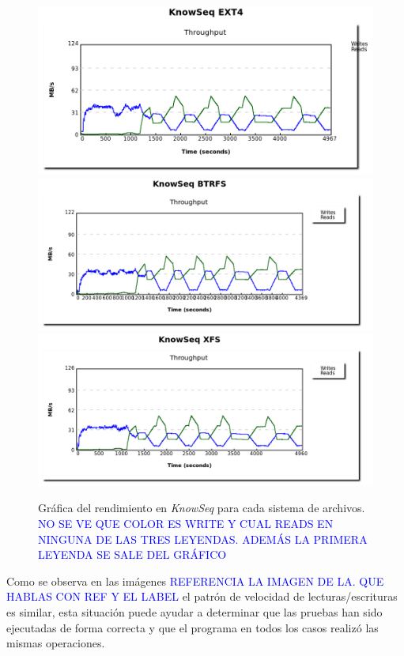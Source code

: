\begin{figure}[H]
    \centering
    \includegraphics[scale=0.35]{doc/assets/images/Capitulo4/Knowseq/knowseq_ext4.png}
    \includegraphics[scale=0.35]{doc/assets/images/Capitulo4/Knowseq/knowseq_btrfs.png}
    \includegraphics[scale=0.35]{doc/assets/images/Capitulo4/Knowseq/knowseq_xfs.png}
    \caption{Gráfica del rendimiento en \textit{KnowSeq} para cada sistema de archivos.  \textcolor{blue}{NO SE VE QUE COLOR ES WRITE Y CUAL READS EN NINGUNA DE LAS TRES LEYENDAS. ADEMÁS LA PRIMERA LEYENDA SE SALE DEL GRÁFICO}}
    \label{fig:my_label}
\end{figure}

Como se observa en las imágenes \textcolor{blue}{REFERENCIA LA IMAGEN DE LA. QUE HABLAS CON REF Y EL LABEL} el patrón de velocidad de lecturas/escrituras es similar, esta situación puede ayudar a determinar que las pruebas han sido ejecutadas de forma correcta y que el programa en todos los casos realizó las mismas operaciones.

